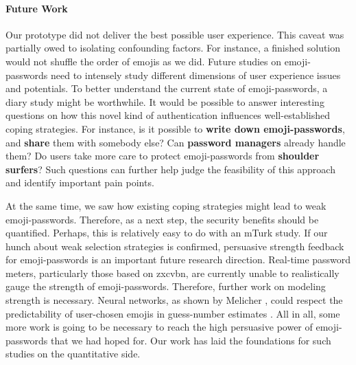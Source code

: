 \paragraph{Future Work}
Our prototype did not deliver the best possible user experience. This caveat was partially owed to isolating confounding factors. For instance, a finished solution would not shuffle the order of emojis as we did. Future studies on emoji-passwords need to intensely study different dimensions of user experience issues and potentials. To better understand the current state of emoji-passwords, a diary study might be worthwhile. It would be possible to answer interesting questions on how this novel kind of authentication influences well-established coping strategies. For instance, is it possible to \textbf{write down emoji-passwords}, and \textbf{share} them with somebody else? Can \textbf{password managers} already handle them?  Do users take more care to protect emoji-passwords from \textbf{shoulder surfers}? Such questions can further help judge the feasibility of this approach and identify important pain points.

At the same time, we saw how existing coping strategies might lead to weak emoji-passwords. Therefore, as a next step, the security benefits should be quantified. Perhaps, this is relatively easy to do with an \gls{mTurk} study. If our hunch about weak selection strategies is confirmed, persuasive strength feedback for emoji-passwords is an important future research direction. Real-time password meters, particularly those based on zxcvbn, are currently unable to realistically gauge the strength of emoji-passwords. Therefore, further work on modeling strength is necessary. Neural networks, as shown by Melicher \etal, could respect the predictability of user-chosen emojis in guess-number estimates \cite{Melicher2016NeuralNetworks}. All in all, some more work is going to be necessary to reach the high persuasive power of emoji-passwords that we had hoped for. Our work has laid the foundations for such studies on the quantitative side. 

